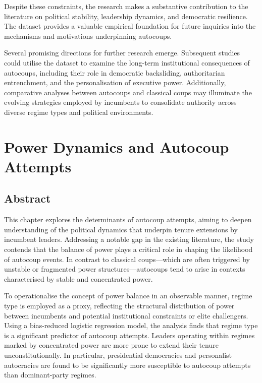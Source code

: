 \documentclass[
  12pt,
]{report}
\begin{document}
Despite these constraints, the research makes a substantive contribution
to the literature on political stability, leadership dynamics, and
democratic resilience. The dataset provides a valuable empirical
foundation for future inquiries into the mechanisms and motivations
underpinning autocoups.

Several promising directions for further research emerge. Subsequent
studies could utilise the dataset to examine the long-term institutional
consequences of autocoups, including their role in democratic
backsliding, authoritarian entrenchment, and the personalisation of
executive power. Additionally, comparative analyses between autocoups
and classical coups may illuminate the evolving strategies employed by
incumbents to consolidate authority across diverse regime types and
political environments.

\chapter{Power Dynamics and Autocoup Attempts}\label{sec-chapter2}

\section*{Abstract}\label{abstract-2}

This chapter explores the determinants of autocoup attempts, aiming to
deepen understanding of the political dynamics that underpin tenure
extensions by incumbent leaders. Addressing a notable gap in the
existing literature, the study contends that the balance of power plays
a critical role in shaping the likelihood of autocoup events. In
contrast to classical coups---which are often triggered by unstable or
fragmented power structures---autocoups tend to arise in contexts
characterised by stable and concentrated power.

To operationalise the concept of power balance in an observable manner,
regime type is employed as a proxy, reflecting the structural
distribution of power between incumbents and potential institutional
constraints or elite challengers. Using a bias-reduced logistic
regression model, the analysis finds that regime type is a significant
predictor of autocoup attempts. Leaders operating within regimes marked
by concentrated power are more prone to extend their tenure
unconstitutionally. In particular, presidential democracies and
personalist autocracies are found to be significantly more susceptible
to autocoup attempts than dominant-party regimes.
\end{document}
